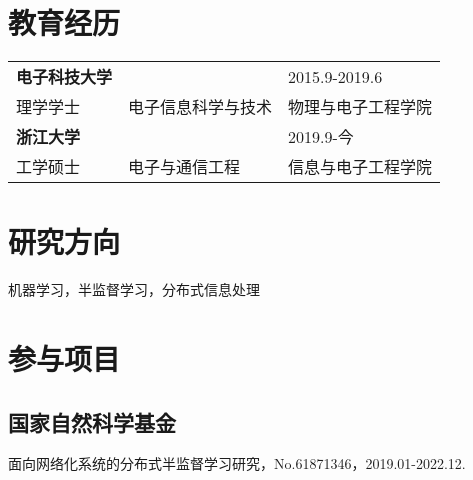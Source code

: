 \cleardoublepage
{

    \appendixsecmajornumbering

    \section*{教育经历}
    \begin{table}[htbp]
        \begin{tabularx}{\textwidth}{XXX}
            \textbf{电子科技大学} &  &  2015.9-2019.6 \\ 
            理学学士 &  电子信息科学与技术 & 物理与电子工程学院 \\
            \textbf{浙江大学} &  &   2019.9-今\\
            工学硕士 &  电子与通信工程 & 信息与电子工程学院 \\ 
        \end{tabularx}
    \end{table}

    \section*{研究方向}
    机器学习，半监督学习，分布式信息处理

    \section*{参与项目}
    \subsection*{国家自然科学基金}
    面向网络化系统的分布式半监督学习研究，No.61871346，2019.01-2022.12.
}

